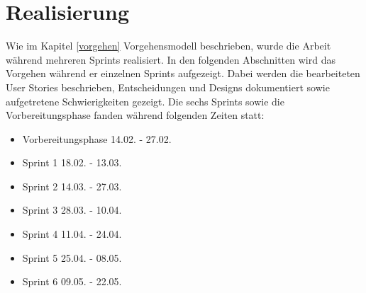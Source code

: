 \chapter{Realisierung}

Wie im Kapitel \ref{vorgehen} Vorgehensmodell beschrieben, wurde die Arbeit während mehreren Sprints realisiert.
In den folgenden Abschnitten wird das Vorgehen während er einzelnen Sprints aufgezeigt.
Dabei werden die bearbeiteten User Stories beschrieben, Entscheidungen und Designs dokumentiert sowie aufgetretene Schwierigkeiten gezeigt.
Die sechs Sprints sowie die Vorbereitungsphase fanden während folgenden Zeiten statt:

\begin{itemize}
   \item Vorbereitungsphase 14.02. - 27.02.
   \item Sprint 1 18.02. - 13.03.
   \item Sprint 2 14.03. - 27.03.
   \item Sprint 3 28.03. - 10.04.
   \item Sprint 4 11.04. - 24.04.
   \item Sprint 5 25.04. - 08.05.
   \item Sprint 6 09.05. - 22.05.
\end{itemize}


\newpage


\newpage

\newpage

\newpage

\newpage

\newpage

\newpage